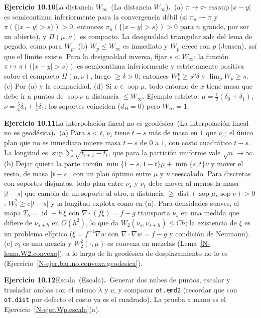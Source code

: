 \documentclass[11pt,a4paper]{amsart}
\newcommand{\id}{\operatorname{id}}
\def\sop{\operatorname {\mathrm{sop}}}
\theoremstyle{remark}
\theoremstyle{definition}
\numberwithin{subsection}{section}
\numberwithin{equation}{section}
\newcommand{\ejlabel}[2]{\par\medskip\noindent\textbf{Ejercicio #1}\ifx\relax#2\relax\else\ (#2)\fi\textbf{.}\ }
\begin{document}
\ejlabel{10.10}{La distancia $W_\infty$}(a) $\pi\mapsto\pi$-$\operatorname{ess\,sup}|x-y|$ es semicontinua inferiormente para la convergencia débil (si $\pi_n\rightharpoonup\pi$ y $\pi(\{|x-y|>s\})>0$, entonces $\pi_n(\{|x-y|>s\})>0$ para $n$ grande, por ser un abierto), y $\Pi(\mu,\nu)$ es compacto. La desigualdad triangular sale del lema de pegado, como para $W_p$. (b) $W_p\le W_\infty$ es inmediato y $W_p$ crece con $p$ (Jensen), así que el límite existe. Para la desigualdad inversa, fijar $s<W_\infty$: la función $\pi\mapsto\pi(\{|x-y|>s\})$ es semicontinua inferiormente y estrictamente positiva sobre el compacto $\Pi(\mu,\nu)$, luego $\ge\delta>0$; entonces $W_p^p\ge s^p\delta$ y $\lim_pW_p\ge s$. (c) Por (a) y la compacidad. (d) Si $x\in\sop\mu$, todo entorno de $x$ tiene masa que debe ir a puntos de $\sop\nu$ a distancia $\le W_\infty$. Ejemplo estricto: $\mu=\frac12(\delta_0+\delta_1)$, $\nu=\frac34\delta_0+\frac14\delta_1$: los soportes coinciden ($d_H=0$) pero $W_\infty=1$.

\ejlabel{10.11}{La interpolación lineal no es geodésica}(a) Para $s<t$, $\nu_t$ tiene $t-s$ más de masa en $1$ que $\nu_s$; el único plan que no es inmediato mueve masa $t-s$ de $0$ a $1$, con costo cuadrático $t-s$. La longitud es $\sup\sum\sqrt{t_{i+1}-t_i}$, que para la partición uniforme vale $\sqrt n\to\infty$. (b) Dejar quieta la parte común $\min\{1-s,1-t\}\mu+\min\{s,t\}\nu$ y mover el resto, de masa $|t-s|$, con un plan óptimo entre $\mu$ y $\nu$ reescalado. Para discretas con soportes disjuntos, todo plan entre $\nu_s$ y $\nu_t$ debe mover al menos la masa $|t-s|$ que cambia de un soporte al otro, a distancia $\ge\operatorname{dist}(\sop\mu,\sop\nu)>0$: $W_2^2\ge c|t-s|$ y la longitud explota como en (a). Para densidades suaves, el mapa $T_h=\id+h\,\xi$ con $\nabla\cdot(f\xi)=f-g$ transporta $\nu_s$ en una medida que difiere de $\nu_{s+h}$ en $O(h^2)$, lo que da $W_2(\nu_s,\nu_{s+h})\le Ch$; la existencia de $\xi$ es un problema elíptico ($\xi=f^{-1}\nabla w$ con $\nabla\cdot\nabla w=f-g$ y condición de Neumann). (c) $\nu_t$ es una mezcla y $W_2^2(\cdot,\mu)$ es convexa en mezclas (Lema~\ref{N-lema.W2.convexo}); a lo largo de la geodésica de desplazamiento no lo es (Ejercicio~\ref{N-ejer.bar.no.convexa.geodesica}).

\ejlabel{10.12}{Escala}Generar dos nubes de puntos, escalar y trasladar ambas con el mismo $\lambda$ y $v$, y comparar \texttt{ot.emd2} (recordar que con \texttt{ot.dist} por defecto el costo ya es el cuadrado). La prueba a mano es el Ejercicio~\ref{N-ejer.Wp.escala}(a).
\end{document}
